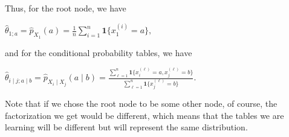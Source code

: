 Thus, for the root node, we have

{\centering$\widehat{\theta }_{1;a}=\widehat{p}_{X_{1}}(a)=\frac{1}{n}\sum _{i=1}^{n}\mathbf{1}\{ x_{1}^{(i)}=a\} ,$ \par}
 
and for the conditional probability tables, we have

{\centering$\widehat{\theta}_{i\mid j;a\mid b} = \widehat{p}_{X_{i}\mid X_{j}}(a\mid b)=\frac{\sum_{\ell=1}^{n}\mathbf{1}\{x_{i}^{(\ell)}=a,x_{j}^{(\ell)}=b\}}{\sum_{\ell=1}^{n}\mathbf{1}\{x_{j}^{(\ell)}=b\}}.$ \par}

Note that if we chose the root node to be some other node, of course, the factorization we get would be different, which means that the tables we are learning will be different but will represent the same distribution.



